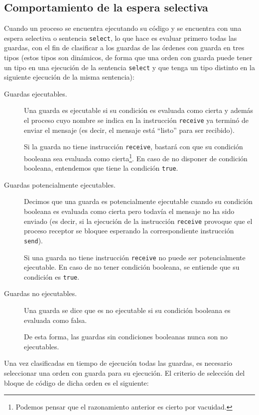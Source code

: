 \subsection{Comportamiento de la espera selectiva}
Cuando un proceso se encuentra ejecutando su código y se encuentra con una espera selectiva o sentencia \verb|select|, lo que hace es evaluar primero todas las guardas, con el fin de clasificar a los guardas de las órdenes con guarda en tres tipos (estos tipos son dinámicos, de forma que una orden con guarda puede tener un tipo en una ejecución de la sentencia \verb|select| y que tenga un tipo distinto en la siguiente ejecución de la misma sentencia):
\begin{description}
    \item [Guardas ejecutables.] Una guarda es ejecutable si su condición es evaluada como cierta y además el proceso cuyo nombre se indica en la instrucción \verb|receive| ya terminó de enviar el mensaje (es decir, el mensaje está ``listo'' para ser recibido).

        Si la guarda no tiene instrucción \verb|receive|, bastará con que su condición booleana sea evaluada como cierta\footnote{Podemos pensar que el razonamiento anterior es cierto por vacuidad.}. En caso de no disponer de condición booleana, entendemos que tiene la condición \verb|true|.
    \item [Guardas potencialmente ejecutables.] Decimos que una guarda es potencialmente ejecutable cuando su condición booleana es evaluada como cierta pero todavía el mensaje no ha sido enviado (es decir, si la ejecución de la instrucción \verb|receive| provoque que el proceso receptor se bloquee esperando la correspondiente instrucción \verb|send|).

        Si una guarda no tiene instrucción \verb|receive| no puede ser potencialmente ejecutable. En caso de no tener condición booleana, se entiende que su condición es \verb|true|.
    \item [Guardas no ejecutables.] Una guarda se dice que es no ejecutable si su condición booleana es evaluada como falsa.

        De esta forma, las guardas sin condiciones booleanas nunca son no ejecutables.
\end{description}
Una vez clasificadas en tiempo de ejecución todas las guardas, es necesario seleccionar una orden con guarda para su ejecución. El criterio de selección del bloque de código de dicha orden es el siguiente:
